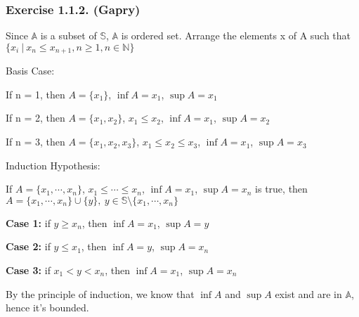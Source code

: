\subsubsection*{Exercise 1.1.2. (Gapry)}

\begin{flushleft}
Since $\mathbb{A}$ is a subset of $\mathbb{S}$, $\mathbb{A}$ is ordered set. Arrange the elements x of A such that $\{ x_i \ | \ x_n \le x_{n + 1}, n \ge 1, n \in \mathbb{N} \}$
\end{flushleft}

\begin{flushleft}
Basis Case: 

If n = 1, then $A = \{x_1\}$, $\inf A = x_1$, $\sup A = x_1$

If n = 2, then $A = \{x_1, x_2\}$, $x_1 \le x_2$, $\inf A = x_1$, $\sup A = x_2$

If n = 3, then $A = \{x_1, x_2, x_3\}$, $x_1 \le x_2 \le x_3$, $\inf A = x_1$, $\sup A = x_3$
\end{flushleft}

\begin{flushleft}
Induction Hypothesis:

If $A = \{x_1, \cdots, x_n\}$, $x_1 \le \cdots \le x_n$, $\inf A = x_1$, $\sup A = x_n$ is true, then
$A = \{x_1, \cdots, x_n\} \cup \{ y \},\ y \in \mathbb{S} \setminus \{x_1, \cdots, x_n\}$ 

\textbf{Case 1:}
if $y \ge x_n$, then $\inf A = x_1$, $\sup A = y$

\textbf{Case 2:}
if $y \le x_1$, then $\inf A = y$, $\sup A = x_n$

\textbf{Case 3:}
if $x_1 < y < x_n$, then $\inf A = x_1$, $\sup A = x_n$
\end{flushleft}

\begin{flushleft}
By the principle of induction, we know that $\inf A$ and $\sup A$ exist and are in $\mathbb{A}$, hence it's bounded.
\end{flushleft}